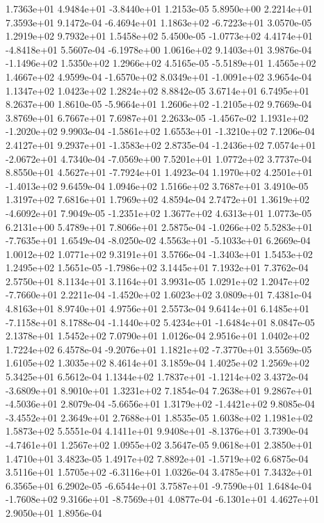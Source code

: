  1.7363e+01  4.9484e+01 -3.8440e+01  1.2153e-05
5.8950e+00 2.2214e+01 7.3593e+01  9.1472e-04
-6.4694e+01  1.1863e+02 -6.7223e+01  3.0570e-05
1.2919e+02 9.7932e+01 1.5458e+02  5.4500e-05
-1.0773e+02  4.4174e+01 -4.8418e+01  5.5607e-04
-6.1978e+00  1.0616e+02  9.1403e+01  3.9876e-04
-1.1496e+02  1.5350e+02  1.2966e+02  4.5165e-05
-5.5189e+01  1.4565e+02  1.4667e+02  4.9599e-04
-1.6570e+02  8.0349e+01 -1.0091e+02  3.9654e-04
1.1347e+02 1.0423e+02 1.2824e+02  8.8842e-05
3.6714e+01 6.7495e+01 8.2637e+00  1.8610e-05
-5.9664e+01  1.2606e+02 -1.2105e+02  9.7669e-04
3.8769e+01 6.7667e+01 7.6987e+01  2.2633e-05
-1.4567e-02  1.1931e+02 -1.2020e+02  9.9903e-04
-1.5861e+02  1.6553e+01 -1.3210e+02  7.1206e-04
 2.4127e+01  9.2937e+01 -1.3583e+02  2.8735e-04
-1.2436e+02  7.0574e+01 -2.0672e+01  4.7340e-04
-7.0569e+00  7.5201e+01  1.0772e+02  3.7737e-04
 8.8550e+01  4.5627e+01 -7.7924e+01  1.4923e-04
 1.1970e+02  4.2501e+01 -1.4013e+02  9.6459e-04
1.0946e+02 1.5166e+02 3.7687e+01  3.4910e-05
1.3197e+02 7.6816e+01 1.7969e+02  4.8594e-04
 2.7472e+01  1.3619e+02 -4.6092e+01  7.9049e-05
-1.2351e+02  1.3677e+02  4.6313e+01  1.0773e-05
6.2131e+00 5.4789e+01 7.8066e+01  2.5875e-04
-1.0266e+02  5.5283e+01 -7.7635e+01  1.6549e-04
-8.0250e-02  4.5563e+01 -5.1033e+01  6.2669e-04
1.0012e+02 1.0771e+02 9.3191e+01  3.5766e-04
-1.3403e+01  1.5453e+02  1.2495e+02  1.5651e-05
-1.7986e+02  3.1445e+01  7.1932e+01  7.3762e-04
2.5750e+01 8.1134e+01 3.1164e+01  3.9931e-05
 1.0291e+02  1.2047e+02 -7.7660e+01  2.2211e-04
-1.4520e+02  1.6023e+02  3.0809e+01  7.4381e-04
4.8163e+01 8.9740e+01 4.9756e+01  2.5573e-04
 9.6414e+01  6.1485e+01 -7.1158e+01  8.1788e-04
-1.1440e+02  5.4234e+01 -1.6484e+01  8.0847e-05
2.1378e+01 1.5452e+02 7.0790e+01  1.0126e-04
2.9516e+01 1.0402e+02 1.7224e+02  6.4578e-04
-9.2076e+01  1.1821e+02 -7.3770e+01  3.5569e-05
1.6105e+02 1.3035e+02 8.4614e+01  3.1859e-04
1.4025e+02 1.2569e+02 5.3425e+01  6.5612e-04
 1.1344e+02  1.7837e+01 -1.1214e+02  3.4372e-04
-3.6809e+01  8.9010e+01  1.3231e+02  7.1854e-04
 7.2638e+01  9.2867e+01 -4.5036e+01  2.8079e-04
-5.6656e+01  1.3179e+02 -1.4421e+02  9.8085e-04
-3.4552e+01  2.3649e+01  2.7688e+01  1.8535e-05
1.6038e+02 1.1981e+02 1.5873e+02  5.5551e-04
 4.1411e+01  9.9408e+01 -8.1376e+01  3.7390e-04
-4.7461e+01  1.2567e+02  1.0955e+02  3.5647e-05
9.0618e+01 2.3850e+01 1.4710e+01  3.4823e-05
 1.4917e+02  7.8892e+01 -1.5719e+02  6.6875e-04
 3.5116e+01  1.5705e+02 -6.3116e+01  1.0326e-04
3.4785e+01 7.3432e+01 6.3565e+01  6.2902e-05
-6.6544e+01  3.7587e+01 -9.7590e+01  1.6484e-04
-1.7608e+02  9.3166e+01 -8.7569e+01  4.0877e-04
-6.1301e+01  4.4627e+01  2.9050e+01  1.8956e-04
